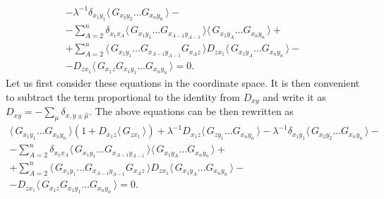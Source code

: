 \documentclass[twocolumn,showpacs,preprintnumbers,superscriptaddress,amsmath,floatfix,amssymb,secnumarabic]{revtex4}
\newcommand{\lr}[1]{ \left( #1 \right) }
\newcommand{\vev}[1]{ \langle \, #1 \, \rangle }
\begin{document}
\begin{widetext}
\begin{eqnarray}
 -
 \lambda^{-1} \delta_{x_1 y_1} \vev{G_{x_2 y_2} \ldots G_{x_n y_n}}
 - \nonumber \\ -
 \sum\limits_{A=2}^{n} \delta_{x_1 x_A} \vev{G_{x_1 y_1} \ldots G_{x_{A-1} y_{A-1}}} \vev{G_{x_1 y_A} \ldots G_{x_n y_n}}
 + \nonumber \\ +
 \sum\limits_{A=2}^{n} \vev{G_{x_1 y_1} \ldots G_{x_{A-1} y_{A-1}} G_{x_A z}} D_{z x_1} \vev{G_{x_1 y_A} \ldots G_{x_n y_n}}
 - \nonumber \\ -
 D_{z x_1} \vev{G_{x_1 z} G_{x_1 y_1} \ldots G_{x_n y_n}} = 0 .
\end{eqnarray}
Let us first consider these equations in the coordinate space. It is then convenient to subtract the term proportional to the identity from $D_{xy}$ and write it as $D_{xy} = - \sum\limits_{\mu} \delta_{x, y \pm \hat{\mu}}$. The above equations can be then rewritten as
\begin{eqnarray}
\label{sd_G_coordinate_space}
 \vev{ G_{x_1 y_1} \ldots G_{x_n y_n} } \lr{1 + D_{x_1 z} \vev{G_{z x_1}}}
 +
 \lambda^{-1} D_{x_1 z} \vev{G_{z y_1} \ldots G_{x_n y_n}}
 -
 \lambda^{-1} \delta_{x_1 y_1} \vev{G_{x_2 y_2} \ldots G_{x_n y_n}}
 - \nonumber \\ -
 \sum\limits_{A=2}^{n} \delta_{x_1 x_A} \vev{G_{x_1 y_1} \ldots G_{x_{A-1} y_{A-1}}} \vev{G_{x_1 y_A} \ldots G_{x_n y_n}}
 + \nonumber \\ +
 \sum\limits_{A=2}^{n} \vev{G_{x_1 y_1} \ldots G_{x_{A-1} y_{A-1}} G_{x_A z}} D_{z x_1} \vev{G_{x_1 y_A} \ldots G_{x_n y_n}}
 - \nonumber \\ -
 D_{z x_1} \vev{G_{x_1 z} G_{x_1 y_1} \ldots G_{x_n y_n}} = 0 .
\end{eqnarray}



\end{widetext}
\end{document}

